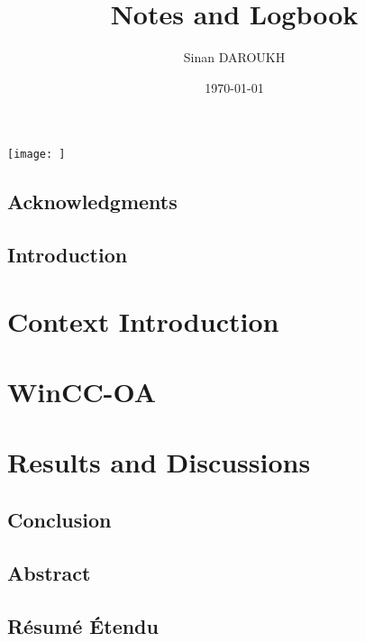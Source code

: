 \documentclass[a4paper, 12pt]{report}
\title{Notes and Logbook}
\author{Sinan DAROUKH}
\date{\today}
\begin{document}
\begin{titlepage}

\texttt{[image: ]}



\end{titlepage}


\renewcommand{\contentsname}{Table of contents}
\tableofcontents
\newpage
\renewcommand{\listfigurename}{Table of figures and illustrations}
\listoffigures
\newpage


\chapter*{Acknowledgments}

\chapter*{Introduction}


\part{Context Introduction}


\part{WinCC-OA}


\part{Results and Discussions}


\chapter*{Conclusion}


\chapter*{Abstract}


\chapter*{Résumé Étendu}

\end{document}
